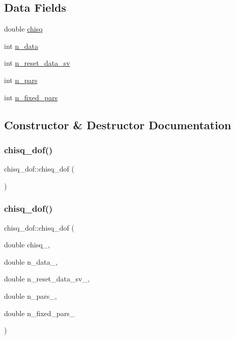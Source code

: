 \subsection*{Data Fields}
\begin{DoxyCompactItemize}
\item 
double \mbox{\hyperlink{structchisq__dof_ac10dc61cd9ea8b167b6907a463dc9fab}{chisq}}
\item 
int \mbox{\hyperlink{structchisq__dof_ac7a1d6147b36daa15cc95be7cab6952b}{n\+\_\+data}}
\item 
int \mbox{\hyperlink{structchisq__dof_ae0fec0a9a6d574999d341c26c730ab26}{n\+\_\+reset\+\_\+data\+\_\+sv}}
\item 
int \mbox{\hyperlink{structchisq__dof_a8cff2bd785177dd41a3eb0faa1a7fbc6}{n\+\_\+pars}}
\item 
int \mbox{\hyperlink{structchisq__dof_ad0508e05295ca3c8ae6a5ab9df486fdd}{n\+\_\+fixed\+\_\+pars}}
\end{DoxyCompactItemize}


\subsection{Constructor \& Destructor Documentation}
\mbox{\label{structchisq__dof_a19eaad60dbf9e94aacb33408a49d9d68}} 
\subsubsection{\texorpdfstring{chisq\_dof()}{chisq\_dof()}\hspace{0.1cm}{\footnotesize\ttfamily [1/4]}}
{\footnotesize\ttfamily chisq\+\_\+dof\+::chisq\+\_\+dof (\begin{DoxyParamCaption}{ }\end{DoxyParamCaption})\hspace{0.3cm}{\ttfamily [inline]}}

\mbox{\label{structchisq__dof_ad78b147829b0f449ac59964a25953c67}} 
\subsubsection{\texorpdfstring{chisq\_dof()}{chisq\_dof()}\hspace{0.1cm}{\footnotesize\ttfamily [2/4]}}
{\footnotesize\ttfamily chisq\+\_\+dof\+::chisq\+\_\+dof (\begin{DoxyParamCaption}\item[{double}]{chisq\+\_\+,  }\item[{double}]{n\+\_\+data\+\_\+,  }\item[{double}]{n\+\_\+reset\+\_\+data\+\_\+sv\+\_\+,  }\item[{double}]{n\+\_\+pars\+\_\+,  }\item[{double}]{n\+\_\+fixed\+\_\+pars\+\_\+ }\end{DoxyParamCaption})\hspace{0.3cm}{\ttfamily [inline]}}

